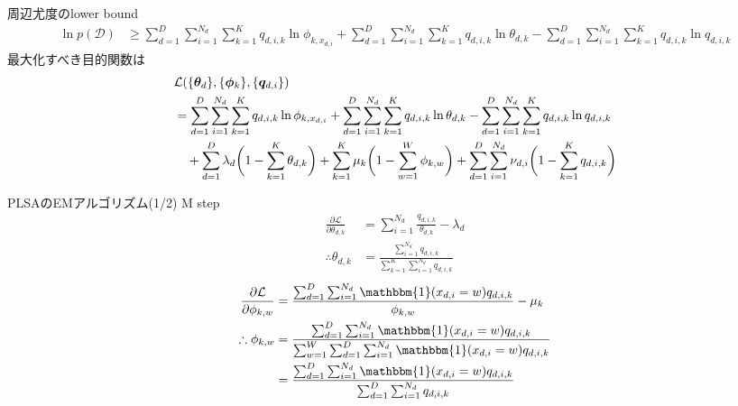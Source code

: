 \documentclass[aspectratio=169,unicode,dvipdfmx,14pt]{beamer}
\begin{document}
\begin{frame}{周辺尤度のlower bound}
\FontMath
\begin{align}
\ln p(\mathcal{D})
& \geq 
\sum_{d=1}^D \sum_{i=1}^{N_d} \sum_{k=1}^K q_{d,i,k} \ln \phi_{k, x_{d,i}} 
+ \sum_{d=1}^D \sum_{i=1}^{N_d} \sum_{k=1}^K q_{d,i,k} \ln \theta_{d,k}
- \sum_{d=1}^D \sum_{i=1}^{N_d} \sum_{k=1}^K q_{d,i,k} \ln q_{d,i,k}
\end{align}
最大化すべき目的関数は
\begin{align}
& \mathcal{L}(  \{ \bm{\theta}_d \}, \{ \bm{\phi}_k \}, \{ \bm{q}_{d,i} \} ) \notag \\
& = \sum_{d=1}^D \sum_{i=1}^{N_d} \sum_{k=1}^K q_{d,i,k} \ln \phi_{k, x_{d,i}} 
+ \sum_{d=1}^D \sum_{i=1}^{N_d} \sum_{k=1}^K q_{d,i,k} \ln \theta_{d,k}
- \sum_{d=1}^D \sum_{i=1}^{N_d} \sum_{k=1}^K q_{d,i,k} \ln q_{d,i,k}
\notag \\ & \mbox{ \ \ }
+ \sum_{d=1}^D \lambda_d \bigg( 1 - \sum_{k=1}^K \theta_{d,k} \bigg)
+ \sum_{k=1}^K \mu_k \bigg( 1 - \sum_{w=1}^W \phi_{k,w} \bigg)
+ \sum_{d=1}^D \sum_{i=1}^{N_d} \nu_{d,i} \bigg( 1 - \sum_{k=1}^K q_{d,i,k} \bigg)
\end{align}
\end{frame}

\begin{frame}{PLSAのEMアルゴリズム(1/2)}
\FontMath
M step
\begin{align}
\frac{\partial \mathcal{L}}{\partial \theta_{d,k}}
& = \sum_{i=1}^{N_d} \frac{ q_{d,i,k}  }{ \theta_{d,k} }
- \lambda_d \\
\therefore \theta_{d,k} & = \frac{ \sum_{i=1}^{N_d} q_{d,i,k} }{ \sum_{k=1}^K \sum_{i=1}^{N_d} q_{d,i,k} }
\end{align}
\begin{align}
\frac{\partial \mathcal{L}}{\partial \phi_{k,w}}
& = \frac{ \sum_{d=1}^D \sum_{i=1}^{N_d} \mathbbm{1}(x_{d,i} = w) q_{d,i,k} }{ \phi_{k, w} }
- \mu_k \\
\therefore \phi_{k,w} & 
= \frac{ \sum_{d=1}^D \sum_{i=1}^{N_d} \mathbbm{1}(x_{d,i} = w) q_{d,i,k} }
{ \sum_{w=1}^W \sum_{d=1}^D \sum_{i=1}^{N_d} \mathbbm{1}(x_{d,i} = w) q_{d,i,k} }
\notag \\ &
= \frac{ \sum_{d=1}^D \sum_{i=1}^{N_d} \mathbbm{1}(x_{d,i} = w) q_{d,i,k} }
{ \sum_{d=1}^D \sum_{i=1}^{N_d} q_{d,i,k} }
\end{align}
\end{frame}
\end{document}
